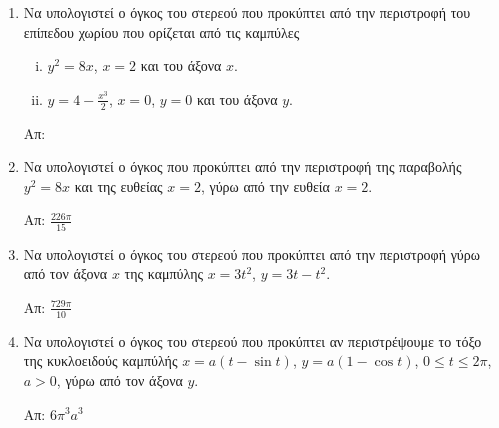 \begin{enumerate}
\item Να υπολογιστεί ο όγκος του στερεού που προκύπτει από την περιστροφή του
	επίπεδου χωρίου που ορίζεται από τις καμπύλες 
	\begin{enumerate}[i)]
	\item 	$ y^{2} = 8x $, $ x=2 $ και	του άξονα $x$.
	\item $ y = 4 - \frac{x^{3}}{2} $, $ x=0 $, $ y=0 $ και του άξονα $y$.
	\end{enumerate}

	\hfill Απ: 

\item Να υπολογιστεί ο όγκος που προκύπτει από την περιστροφή της παραβολής $
	y^{2} = 8x $ και της ευθείας $ x=2 $, γύρω από την ευθεία $ x=2 $.

	\hfill Απ: $ \frac{226 \pi}{15} $

\item Να υπολογιστεί ο όγκος του στερεού που προκύπτει από την περιστροφή γύρω
	από τον άξονα $x$ της καμπύλης $ x=3t^{2} $, $ y=3t-t^{2} $.

	\hfill Απ: $ \frac{729 \pi}{10}  $

\item Να υπολογιστεί ο όγκος του στερεού που προκύπτει αν περιστρέψουμε το τόξο της κυκλοειδούς
	καμπύλής $ x = a(t - \sin{t}) $, $ y = a(1 - \cos{t}) $, $ 0\leq t\leq 2 \pi $, $ a>0 $, γύρω
	από τον άξονα $ y $.

	\hfill Απ: $ 6 \pi ^{3} a^{3}$ 
\end{enumerate}


